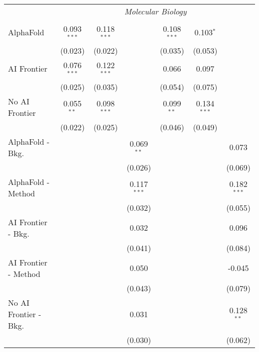 \begin{tabular}{lcccccc}
 & \multicolumn{6}{c}{\textit{Molecular Biology}} \\ \\
   AlphaFold               & 0.093$^{***}$ & 0.118$^{***}$ &               & 0.108$^{***}$ & 0.103$^{*}$   &   \\   
                           & (0.023)       & (0.022)       &               & (0.035)       & (0.053)       &   \\   
   AI Frontier             & 0.076$^{***}$ & 0.122$^{***}$ &               & 0.066         & 0.097         &   \\   
                           & (0.025)       & (0.035)       &               & (0.054)       & (0.075)       &   \\   
   No AI Frontier          & 0.055$^{**}$  & 0.098$^{***}$ &               & 0.099$^{**}$  & 0.134$^{***}$ &   \\   
                           & (0.022)       & (0.025)       &               & (0.046)       & (0.049)       &   \\   
   AlphaFold - Bkg.        &               &               & 0.069$^{**}$  &               &               & 0.073\\   
                           &               &               & (0.026)       &               &               & (0.069)\\   
   AlphaFold - Method      &               &               & 0.117$^{***}$ &               &               & 0.182$^{***}$\\   
                           &               &               & (0.032)       &               &               & (0.055)\\   
   AI Frontier - Bkg.      &               &               & 0.032         &               &               & 0.096\\   
                           &               &               & (0.041)       &               &               & (0.084)\\   
   AI Frontier - Method    &               &               & 0.050         &               &               & -0.045\\   
                           &               &               & (0.043)       &               &               & (0.079)\\   
   No AI Frontier - Bkg.   &               &               & 0.031         &               &               & 0.128$^{**}$\\   
                           &               &               & (0.030)       &               &               & (0.062)\\   

\end{tabular}
